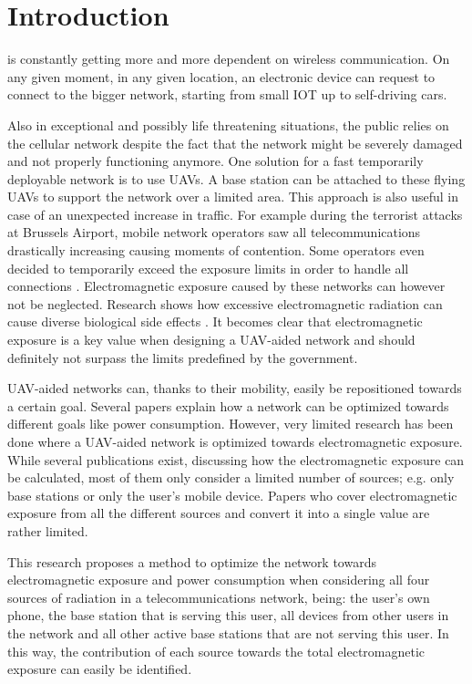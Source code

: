 \documentclass[twocolumn]{phdsymp} %
\begin{document}
\section{Introduction}
 is constantly getting more and more dependent on wireless communication. 
On any given moment, in any given location, an electronic device
can request to connect to the bigger network, 
starting from small \gls{IOT} up to self-driving cars.

Also in exceptional and possibly life threatening situations, the public relies on the cellular network
despite the fact that the network might be severely damaged and not properly functioning anymore.
One solution for a fast temporarily deployable network is to use \gls{UAV}s. A base station can be attached to 
these flying \gls{UAV}s to support the network over a limited area. 
This approach is also useful in case of an unexpected increase in traffic. 
For example during the terrorist attacks at Brussels Airport,
mobile network operators saw all telecommunications drastically increasing causing moments of contention. 
Some operators even decided to temporarily exceed the exposure limits in
order to handle all connections \cite{baseZaventem}.
Electromagnetic exposure caused by these networks can however not be neglected. 
Research shows how excessive electromagnetic radiation can cause diverse biological side effects \cite{bioeffects,WHO}.
It becomes clear that electromagnetic exposure is a key value when designing a \gls{UAV}-aided network and should definitely 
not surpass the limits predefined by the government.

\gls{UAV}-aided networks can, thanks to their mobility, easily be repositioned towards a certain goal. Several papers 
explain how a network can be optimized towards different goals like power consumption.
However, very limited
research has been done where a \gls{UAV}-aided network is optimized towards electromagnetic exposure.
While several publications exist, discussing how the electromagnetic exposure can be calculated, 
most of them only consider a limited number of sources; e.g. only base stations or only the user's mobile device.
Papers who cover electromagnetic exposure from all the different sources and convert it into a single value are rather limited.

This research proposes a method to optimize the network towards electromagnetic exposure and power consumption
when considering all four sources of radiation in a telecommunications network, being: the user's own phone,
 the base station that is serving this user, 
all devices from other users in the network and all 
other active base stations that are not serving this user. In this way, the contribution of each source towards the total 
electromagnetic exposure can easily be identified. 
\end{document}

